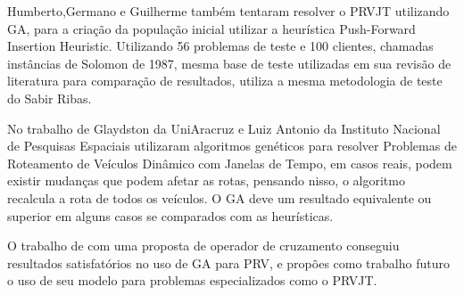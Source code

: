 Humberto,Germano e Guilherme também tentaram resolver o PRVJT utilizando GA, para a criação da população inicial utilizar a heurística Push-Forward Insertion Heuristic. Utilizando 56 problemas de teste e 100 clientes, chamadas instâncias de Solomon de 1987, mesma base de teste utilizadas em sua revisão de literatura para comparação de resultados, utiliza a mesma metodologia de teste do Sabir Ribas. \cite{HGGUILHERME}

No trabalho de Glaydston da UniAracruz e Luiz Antonio da Instituto Nacional de Pesquisas Espaciais utilizaram algoritmos genéticos para resolver Problemas de Roteamento de Veículos Dinâmico com Janelas de Tempo, em casos reais, podem existir mudanças que podem afetar as rotas, pensando nisso, o algoritmo recalcula a rota de todos os veículos. O GA deve um resultado equivalente ou superior em alguns casos se comparados com as heurísticas. \cite{GLAYDSTON}

O trabalho de \cite{Pereira_Tavares} com uma proposta de operador de cruzamento conseguiu resultados satisfatórios no uso de GA para PRV, e propões como trabalho futuro o uso de seu modelo para problemas especializados como o PRVJT.
